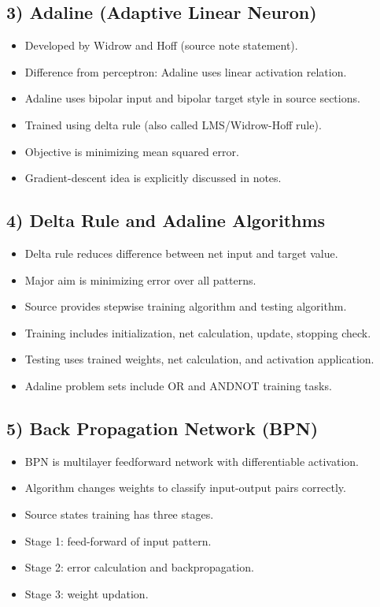 \documentclass[11pt,a4paper]{article}
\begin{document}
\subsection*{3) Adaline (Adaptive Linear Neuron)}
\begin{itemize}
\item Developed by Widrow and Hoff (source note statement).
\item Difference from perceptron: Adaline uses linear activation relation.
\item Adaline uses bipolar input and bipolar target style in source sections.
\item Trained using delta rule (also called LMS/Widrow-Hoff rule).
\item Objective is minimizing mean squared error.
\item Gradient-descent idea is explicitly discussed in notes.
\end{itemize}

\subsection*{4) Delta Rule and Adaline Algorithms}
\begin{itemize}
\item Delta rule reduces difference between net input and target value.
\item Major aim is minimizing error over all patterns.
\item Source provides stepwise training algorithm and testing algorithm.
\item Training includes initialization, net calculation, update, stopping check.
\item Testing uses trained weights, net calculation, and activation application.
\item Adaline problem sets include OR and ANDNOT training tasks.
\end{itemize}

\subsection*{5) Back Propagation Network (BPN)}
\begin{itemize}
\item BPN is multilayer feedforward network with differentiable activation.
\item Algorithm changes weights to classify input-output pairs correctly.
\item Source states training has three stages.
\item Stage 1: feed-forward of input pattern.
\item Stage 2: error calculation and backpropagation.
\item Stage 3: weight updation.
\end{itemize}
\end{document}
